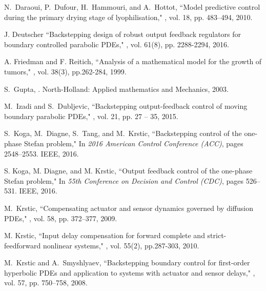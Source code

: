 \documentclass[journal]{IEEEtran}
\begin{document}
\begin{thebibliography}{99}
N.~Daraoui, P.~Dufour, H.~Hammouri, and A.~Hottot,
\newblock ``Model predictive control during the primary drying stage of
  lyophilisation,"
, vol. 18, pp. 483--494, 2010.

  
 J. Deutscher
     \newblock ``Backstepping design of robust output feedback regulators for boundary controlled parabolic PDEs,"
, vol. 61(8), pp. 2288-2294, 2016.

A. Friedman and F. Reitich, 
\newblock ``Analysis of a mathematical model for the growth of tumors,"
, vol. 38(3), pp.262-284, 1999.

S.~Gupta,
.
\newblock North-Holland: Applied mathematics and Mechanics, 2003.

M.~Izadi and S.~Dubljevic,
\newblock ``Backstepping output-feedback control of moving boundary parabolic
  {PDE}s,"
, vol. 21, pp. 27 -- 35, 2015.

S.~Koga, M.~Diagne, S.~Tang, and M.~Krstic,
\newblock ``Backstepping control of the one-phase Stefan problem,"
\newblock In {\em 2016 American Control Conference (ACC)}, pages 2548--2553.
  IEEE, 2016.

S. Koga, M. Diagne, and M. Krstic,
\newblock ``Output feedback control of the one-phase Stefan problem,"
\newblock In {\em 55th Conference on Decision and Control (CDC)}, pages 526--531.
  IEEE, 2016.

M.~Krstic,
\newblock ``Compensating actuator and sensor dynamics governed by diffusion
  {PDE}s,"
, vol. 58, pp. 372--377, 2009.

M. Krstic, 
\newblock ``Input delay compensation for forward complete and strict-feedforward nonlinear systems,"
, vol. 55(2), pp.287-303, 2010.

M.~Krstic and A.~Smyshlyaev,
\newblock ``Backstepping boundary control for first-order hyperbolic {PDE}s and
  application to systems with actuator and sensor delays,"
, vol. 57, pp. 750--758, 2008.


\end{thebibliography}
\end{document}
